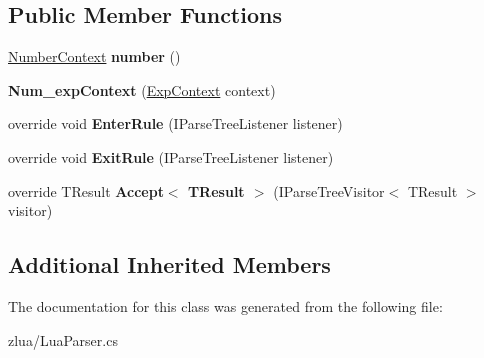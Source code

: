 \subsection*{Public Member Functions}
\begin{DoxyCompactItemize}
\item 
\mbox{\label{classzlua_1_1_lua_parser_1_1_num__exp_context_a375b7dc71ec93925282787fcd47db601}} 
\mbox{\hyperlink{classzlua_1_1_lua_parser_1_1_number_context}{Number\+Context}} {\bfseries number} ()
\item 
\mbox{\label{classzlua_1_1_lua_parser_1_1_num__exp_context_aeb280dbdd912e2ee44e60175730a0749}} 
{\bfseries Num\+\_\+exp\+Context} (\mbox{\hyperlink{classzlua_1_1_lua_parser_1_1_exp_context}{Exp\+Context}} context)
\item 
\mbox{\label{classzlua_1_1_lua_parser_1_1_num__exp_context_a6277291a22619b33351abe0e4ed2af93}} 
override void {\bfseries Enter\+Rule} (I\+Parse\+Tree\+Listener listener)
\item 
\mbox{\label{classzlua_1_1_lua_parser_1_1_num__exp_context_af2185a2e443cb37e1af20c47a461e21b}} 
override void {\bfseries Exit\+Rule} (I\+Parse\+Tree\+Listener listener)
\item 
\mbox{\label{classzlua_1_1_lua_parser_1_1_num__exp_context_a785a464c2cc82439e77e948bb7c7c1c1}} 
override T\+Result {\bfseries Accept$<$ T\+Result $>$} (I\+Parse\+Tree\+Visitor$<$ T\+Result $>$ visitor)
\end{DoxyCompactItemize}
\subsection*{Additional Inherited Members}


The documentation for this class was generated from the following file\+:\begin{DoxyCompactItemize}
\item 
zlua/Lua\+Parser.\+cs\end{DoxyCompactItemize}

